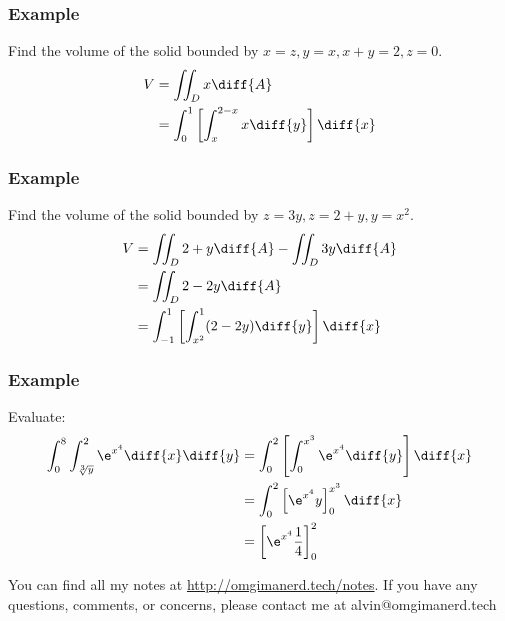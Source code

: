 \documentclass[letterpaper, 12pt]{math}
\begin{document}
\subsubsection*{Example}
Find the volume of the solid bounded by \( x = z, y = x, x+y = 2, z = 0 \).
\begin{align*}
  V &= \iint_{D}x\diff{A} \\
  &= \int_{0}^{1}\left[\int_{x}^{2-x}x\diff{y}\right]\diff{x} \\
\end{align*}

\subsubsection*{Example}
Find the volume of the solid bounded by \( z = 3y, z = 2+y, y = x^2 \).
\begin{align*}
  V &= \iint_{D}2+y\diff{A}-\iint_{D}3y\diff{A} \\
  &= \iint_{D}2-2y\diff{A} \\
  &= \int_{-1}^{1}\left[\int_{x^2}^{1}(2-2y)\diff{y}\right]\diff{x}
\end{align*}

\subsubsection*{Example}
Evaluate:
\begin{align*}
  \int_{0}^{8}\int_{\sqrt[3]{y}}^{2}\e^{x^4}\diff{x}\diff{y} &=
    \int_{0}^{2}\left[\int_{0}^{x^3}\e^{x^4}\diff{y}\right]\diff{x} \\
  &= \int_{0}^{2}\left[\e^{x^4}y\right]_{0}^{x^3}\diff{x} \\
  &= \left[\e^{x^4}\frac{1}{4}\right]_{0}^{2}
\end{align*}

\begin{center}
  You can find all my notes at \url{http://omgimanerd.tech/notes}. If you have
  any questions, comments, or concerns, please contact me at
  alvin@omgimanerd.tech
\end{center}
\end{document}

